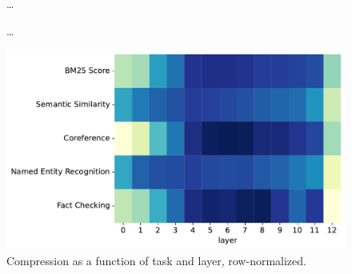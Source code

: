 \begin{figure}
    \centering
    \caption{\dots}
\end{figure}

\begin{figure}
    \centering
    \caption{\dots}
\end{figure}



\begin{figure}
    \centering
    \includegraphics[width=\textwidth]{gfx/probing/heatmap_compression}
    \caption{Compression as a function of task and layer, row-normalized.}
\end{figure}

